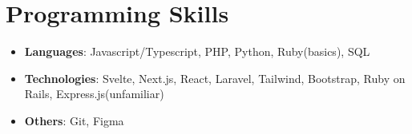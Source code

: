 \documentclass[letterpaper,11pt]{article}
\newcommand{\resumeSubHeadingListStart}{\begin{itemize}[leftmargin=*]}
\newcommand{\resumeSubHeadingListEnd}{\end{itemize}}
\begin{document}
\section{Programming Skills}
 \resumeSubHeadingListStart
   \item{
        \textbf{Languages}{: Javascript/Typescript, PHP, Python, Ruby(basics), SQL }
   }
   \item{
        \textbf{Technologies}{: Svelte, Next.js, React, Laravel, Tailwind, Bootstrap, Ruby on Rails, Express.js(unfamiliar)}
   }
   \item{
        \textbf{Others}{: Git, Figma}
   }
 \resumeSubHeadingListEnd


\end{document}
